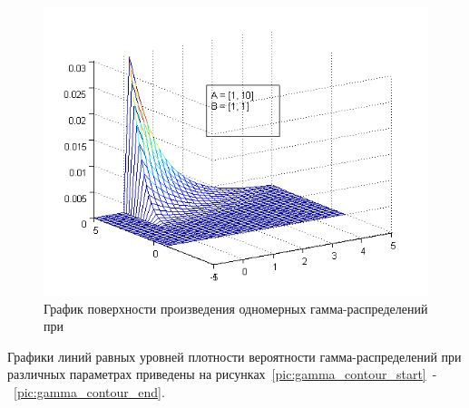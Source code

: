 \begin{figure}[h]
  \centering
  \includegraphics[width=0.58\linewidth]{../pic/new/gamma_mesh_7}
  \caption{График поверхности произведения одномерных гамма-распределений при}\label{pic:gamma_mesh_end}
\end{figure}

\newpage

Графики линий равных уровней плотности вероятности гамма-распределений при различных
параметрах приведены на рисунках~\ref{pic:gamma_contour_start}~-~\ref{pic:gamma_contour_end}.

